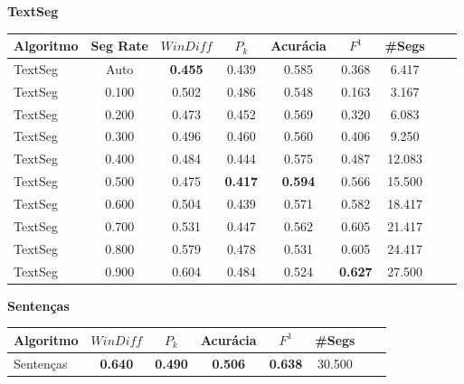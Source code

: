 \documentclass{article}
\begin{document}
 \newpage


{  
\large
\center
	\textbf{TextSeg}  

}

 \begin{longtable}[c]{|l|c|c|c|c|c|c|c|c|} 
\hline 
Algoritmo & Seg Rate & $WinDiff$ & $P_k$ & Acurácia & $F^1$ & \#Segs\\ \hline 
TextSeg & Auto & \cellcolor{gray!20} \textbf{0.455} & 0.439 & 0.585 & 0.368 & 6.417  \\ \hline 
 TextSeg & 0.100 & 0.502 & 0.486 & 0.548 & 0.163 & 3.167  \\ \hline 
 TextSeg & 0.200 & 0.473 & 0.452 & 0.569 & 0.320 & 6.083  \\ \hline 
 TextSeg & 0.300 & 0.496 & 0.460 & 0.560 & 0.406 & 9.250  \\ \hline 
 TextSeg & 0.400 & 0.484 & 0.444 & 0.575 & 0.487 & 12.083  \\ \hline 
 TextSeg & 0.500 & 0.475 & \cellcolor{gray!20} \textbf{0.417} & \cellcolor{gray!20} \textbf{0.594} & 0.566 & 15.500  \\ \hline 
 TextSeg & 0.600 & 0.504 & 0.439 & 0.571 & 0.582 & 18.417  \\ \hline 
 TextSeg & 0.700 & 0.531 & 0.447 & 0.562 & 0.605 & 21.417  \\ \hline 
 TextSeg & 0.800 & 0.579 & 0.478 & 0.531 & 0.605 & 24.417  \\ \hline 
 TextSeg & 0.900 & 0.604 & 0.484 & 0.524 & \cellcolor{gray!20} \textbf{0.627} & 27.500  \\ \hline 
 \end{longtable} 



 \newpage


{  
\large
\center
	\textbf{Sentenças}  

}

\begin{longtable}[c]{|l|c|c|c|c|c|c|c|} 
\hline 
Algoritmo & $WinDiff$ & $P_k$ & Acurácia & $F^1$ & \#Segs\\ \hline 
Sentenças & \cellcolor{gray!20} \textbf{0.640} & \cellcolor{gray!20} \textbf{0.490} & \cellcolor{gray!20} \textbf{0.506} & \cellcolor{gray!20} \textbf{0.638} & 30.500  \\ \hline 
 \end{longtable} 
\newpage
\end{document}
